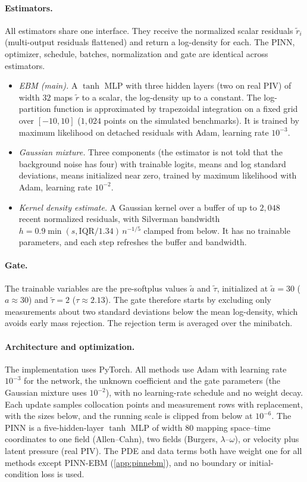 \documentclass[twoside]{article}
\begin{document}
\paragraph{Estimators.}
All estimators share one interface. They receive the normalized scalar residuals
$\tilde r_i$ (multi-output residuals flattened) and return a log-density for
each. The PINN, optimizer, schedule, batches, normalization and gate are
identical across estimators.
\begin{itemize}
\item \emph{EBM (main).} A $\tanh$ MLP with three hidden layers (two on real PIV) of width $32$
maps $\tilde r$ to a scalar, the log-density up to a constant. The
log-partition function is approximated by trapezoidal integration on a fixed
grid over $[-10, 10]$ ($1{,}024$ points on the simulated benchmarks). It is
trained by maximum likelihood on detached residuals with Adam, learning rate
$10^{-3}$.
\item \emph{Gaussian mixture.} Three components (the estimator is not told that
the background noise has four) with trainable
logits, means and log standard deviations, means initialized near zero,
trained by maximum likelihood with Adam, learning rate $10^{-2}$.
\item \emph{Kernel density estimate.} A Gaussian kernel over a buffer of up to
$2{,}048$ recent normalized residuals, with Silverman bandwidth
$h = 0.9\min(s, \mathrm{IQR}/1.34)\,n^{-1/5}$ clamped from below. It has no
trainable parameters, and each step refreshes the buffer and bandwidth.
\end{itemize}

\paragraph{Gate.}
The trainable variables are the pre-softplus values $\tilde a$ and $\tilde\tau$,
initialized at $\tilde a = 30$ ($a \approx 30$) and $\tilde\tau = 2$
($\tau \approx 2.13$). The gate therefore starts by excluding only measurements
about two standard deviations below the mean log-density, which avoids early
mass rejection. The rejection term is averaged over the minibatch.

\paragraph{Architecture and optimization.}
The implementation uses PyTorch. All methods use Adam with learning rate
$10^{-3}$ for the network, the unknown coefficient and the gate parameters (the
Gaussian mixture uses $10^{-2}$), with no learning-rate schedule and no weight
decay. Each update samples collocation points and measurement rows with
replacement, with the sizes below, and the running scale is clipped from below
at $10^{-6}$. The PINN is a five-hidden-layer
$\tanh$ MLP of width $80$ mapping space--time coordinates to one field (Allen--Cahn), two
fields (Burgers, $\lambda$--$\omega$), or velocity plus latent pressure (real
PIV). The PDE and data terms both have weight one for all methods except PINN-EBM
(\cref{app:pinnebm}), and no boundary or initial-condition loss is used.
\end{document}
